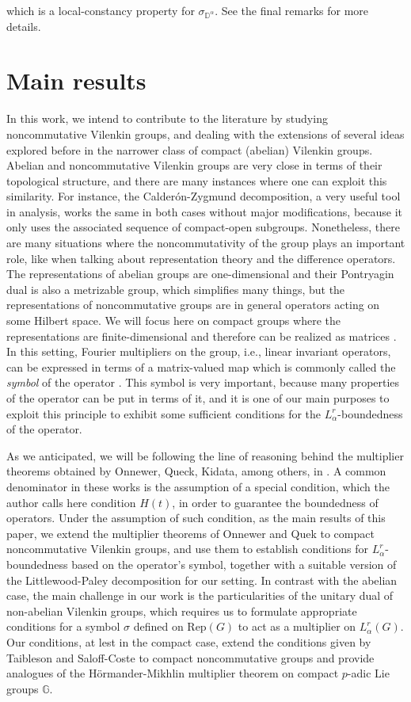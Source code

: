 \documentclass[12pt, reqno]{amsart}
\newcommand{\1}{\mathds{1}}
\begin{document}
which is a local-constancy property for $\sigma_{ \mathbb{D}^\alpha}$. See the final remarks for more details. 


\section{Main results}
In this work, we intend to contribute to the literature by studying noncommutative Vilenkin groups, and dealing with the extensions of several ideas explored before in the narrower class of compact (abelian) Vilenkin groups. Abelian and noncommutative Vilenkin groups are very close in terms of their topological structure, and there are many instances where one can exploit this similarity. For instance, the Calderón-Zygmund decomposition, a very useful tool in analysis, works the same in both cases without major modifications, because it only uses the associated sequence of compact-open subgroups. Nonetheless, there are many situations where the noncommutativity of the group plays an important role, like when talking about representation theory and the difference operators. The representations of abelian groups are one-dimensional and their Pontryagin dual is also a metrizable group, which simplifies many things, but the representations of noncommutative groups are in general operators acting on some Hilbert space. We will focus here on compact groups where the representations are finite-dimensional and therefore can be realized as matrices \cite{Fischer2015, Fischer2020}. In this setting, Fourier multipliers on the group, i.e., linear invariant operators, can be expressed in terms of a matrix-valued map which is commonly called the \emph{symbol} of the operator \cite{Ruzhansky2010}. This symbol is very important, because many properties of the operator can be put in terms of it, and it is one of our main purposes to exploit this principle to exhibit some sufficient conditions for the $L^r_\alpha$-boundedness of the operator.

As we anticipated, we will be following the line of reasoning behind the multiplier theorems obtained by Onnewer, Queck, Kidata, among others, in \cite{Onneweer1985, Onneweer1989, Kitada1987, Yueping2002}. A common denominator in these works is the assumption of a special condition, which the author calls here condition $H(t)$, in order to guarantee the boundedness of operators. Under the assumption of such condition, as the main results of this paper, we extend the multiplier theorems of Onnewer and Quek to compact noncommutative Vilenkin groups, and use them to establish conditions for $L_\alpha^r$-boundedness based on the operator’s symbol, together with a suitable version of the Littlewood-Paley decomposition for our setting. In contrast with the abelian case, the main challenge in our work is the particularities of the unitary dual of non-abelian Vilenkin groups, which requires us to formulate appropriate conditions for a symbol $\sigma$ defined on $\mathrm{Rep}(G)$ to act as a multiplier on $L^r_\alpha(G)$. Our conditions, at lest in the compact case, extend the conditions given by Taibleson \cite{Taibleson1970} and Saloff-Coste \cite{SaloffCoste1986} to compact noncommutative groups and provide analogues of the Hörmander-Mikhlin multiplier theorem on compact $p$-adic Lie groups $\mathbb{G}$.
\end{document}
